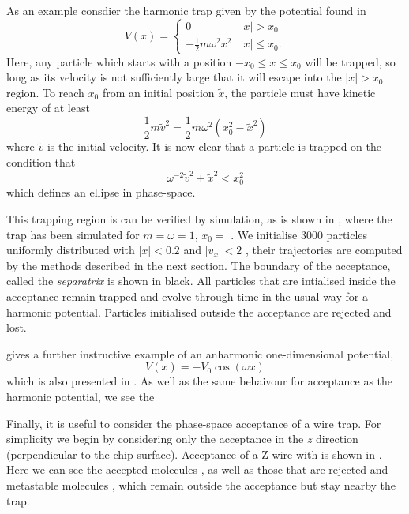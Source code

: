 As an example consdier the harmonic trap given by the potential found in
%
\begin{equation}
  V(x) = \begin{cases}
    0 & |x| > x_0 \\
    -\frac{1}{2}m\omega^2 x^2 & |x| \leq x_0.
  \end{cases}
\end{equation}
%
Here, any particle which starts with a position $-x_0 \leq x \leq x_0$ will be
trapped, so long as its velocity is not sufficiently large that it will escape
into the $|x|> x_0$ region. To reach $x_0$ from an initial position
$\tilde{x}$, the particle must have kinetic energy of at least
%
\begin{equation}
  \frac{1}{2}m\tilde{v}^2 = \frac{1}{2}m\omega^2(x_0^2 - \tilde{x}^2)
\end{equation}
%
where $\tilde{v}$ is the initial velocity. It is now clear that a particle is
trapped on the condition that
%
\begin{equation}
  \omega^{-2} \tilde{v}^2 + \tilde{x}^2 < x_0^2
\end{equation}
%
which defines an ellipse in phase-space.

This trapping region is can be verified by simulation, as is shown in
, where the trap has been simulated for $m =
\omega = 1$, $x_0 =$ . We initialise 3000 particles uniformly distributed
with $|x| < 0.2$ and $|v_x|<2$ , their trajectories are computed by
the methods described in the next section. The boundary of the acceptance,
called the \emph{separatrix} is shown in black. All particles that are
intialised inside the acceptance remain trapped and evolve through time in the
usual way for a harmonic potential. Particles initialised outside the
acceptance are rejected and lost.

 gives a further instructive example of an anharmonic
one-dimensional potential,
%
\begin{equation}
  V(x) = -V_0\cos(\omega x)
\end{equation}
%
which is also presented in . As well as the same
behaivour for acceptance as the harmonic potential, we see the

Finally, it is useful to consider the phase-space acceptance of a wire trap.
For simplicity we begin by considering only the acceptance in the $z$ direction
(perpendicular to the chip surface). Acceptance of a Z-wire with 
is shown in . Here we can see the accepted
molecules , as well as those that are rejected  and
metastable molecules , which remain outside the acceptance but stay
nearby the trap. 

